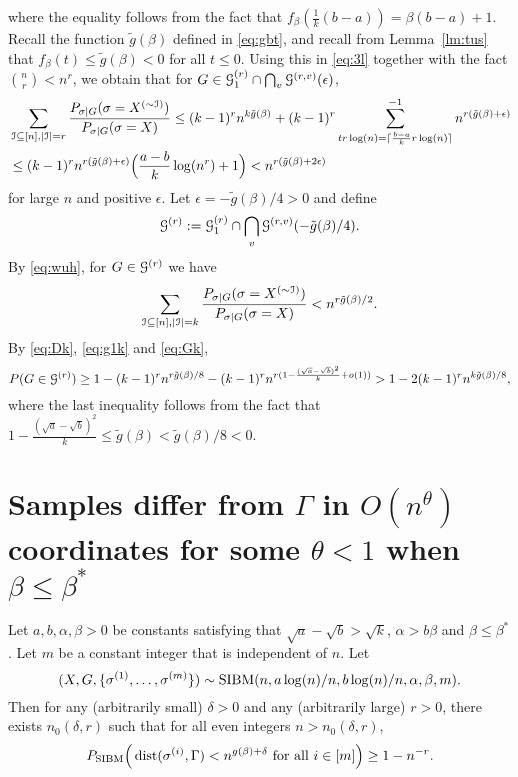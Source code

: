 \documentclass{article}
\begin{document}
where the equality follows from the fact that $f_{\beta}(\frac{1}{k}(b-a))=\beta(b-a)+1$.
Recall the function $\tilde{g}(\beta)$ defined in \eqref{eq:gbt}, and recall from  Lemma~\ref{lm:tus} that
$f_{\beta}(t)\le \tilde{g}(\beta)<0$ for all $t\le 0$.
Using this in \eqref{eq:3l} together with the fact $\binom{n}{r}<n^r$, we obtain that for
$G\in\mathcal{G}_1^{(r)}\cap \bigcap_{v} \mathcal{G}^{(r,v)}(\epsilon)$,
\begin{equation} \label{eq:wuh}
\begin{aligned}
& \sum_{\mathcal{I}\subseteq[n],|\mathcal{I}|=r}
\frac{P_{\sigma|G}(\sigma=X^{(\sim \mathcal{I})} )}
{P_{\sigma|G}(\sigma=X)} 
\le (k-1)^rn^{k\tilde{g}(\beta)}
+ (k-1)^r\sum_{tr\log(n)=\lceil\frac{b-a}{k}r\log(n) \rceil}^{-1}  n^{r(\tilde{g}(\beta) + \epsilon)}  \\
& \le(k-1)^r n^{r(\tilde{g}(\beta) + \epsilon)}
\Big(\frac{a-b}{k}\log(n^r)+1 \Big)
< n^{r(\tilde{g}(\beta) + 2\epsilon)} 
\end{aligned}
\end{equation}
for large $n$ and positive $\epsilon$.
Let $\epsilon=-\tilde{g}(\beta)/4>0$ and define
$$
\mathcal{G}^{(r)}:=\mathcal{G}_1^{(r)}\cap \bigcap_{v} \mathcal{G}^{(r,v)}(-\tilde{g}(\beta)/4) .
$$
By \eqref{eq:wuh}, for $G\in\mathcal{G}^{(r)}$ we have
$$
\sum_{\mathcal{I}\subseteq[n],|\mathcal{I}|=k}
\frac{P_{\sigma|G}(\sigma=X^{(\sim \mathcal{I})} )}
{P_{\sigma|G}(\sigma=X)} <
n^{r \tilde{g}(\beta) /2} .
$$
By \eqref{eq:Dk}, \eqref{eq:g1k} and \eqref{eq:Gk}, 
$$
P(G\in\mathcal{G}^{(r)})\ge 1-(k-1)^rn^{r\tilde{g}(\beta)/8}- (k-1)^rn^{r (1-\frac{(\sqrt{a}-\sqrt{b})^2}{k} + o(1) )}> 1- 2(k-1)^r n^{k\tilde{g}(\beta)/8},
$$
where the last inequality follows from the fact that $1-\frac{(\sqrt{a}-\sqrt{b})^2}{k}\le
\tilde{g}(\beta)<\tilde{g}(\beta)/8< 0$.

\section{Samples differ from $\Gamma$ in $O(n^{\theta})$ coordinates for some $\theta<1$ when $\beta\le\beta^\ast$}
\label{sect:theta}



\begin{proposition} \label{prop:43}
Let $a,b,\alpha,\beta> 0$ be constants satisfying that $\sqrt{a}-\sqrt{b} > \sqrt{k}$, $\alpha>b\beta$ and $\beta\le\beta^\ast$. Let $m$ be a constant integer that is independent of $n$.
Let 
$$
(X,G,\{\sigma^{(1)},\dots,\sigma^{(m)}\})\sim \operatorname{SIBM}(n,a\log(n)/n, b\log(n)/n,\alpha,\beta, m) .
$$
Then for any (arbitrarily small) $\delta>0$ and any (arbitrarily large) $r>0$, there exists $n_0(\delta, r)$ such that for all even integers $n>n_0(\delta, r)$,
$$
P_{\operatorname{SIBM}} \Big(\operatorname{dist}(\sigma^{(i)},\Gamma)<n^{g(\beta)+\delta}
\text{~for all~} i\in[m] \Big) \ge 1- n^{-r} .
$$
\end{proposition}
\end{document}
